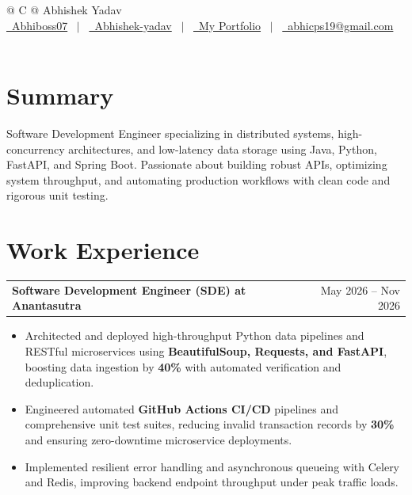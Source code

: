 \documentclass[a4paper,10pt]{article}
\makeatletter
\newenvironment{joblong}[2]
    {
    \begin{tabularx}{\linewidth}{@{}l X r@{}}
    \textbf{#1} & \hfill &  #2 \\[3.50pt]
    \end{tabularx}
    \begin{minipage}[t]{\linewidth}
    \begin{itemize}[nosep,after=\strut, leftmargin=1em, itemsep=3pt,label=--]
    }
    {
    \end{itemize}
    \end{minipage}
    }
\makeatother
\begin{document}
\pagestyle{empty}

\begin{tabularx}{\linewidth}{@{} C @{}}
\Huge{Abhishek Yadav}\\[7.5pt]
\href{https://github.com/Abhiboss07}{\raisebox{-0.05\height}\faGithub\ Abhiboss07} \ $|$ \
\href{https://linkedin.com/in/abhishek-yadav-4738032b7/}{\raisebox{-0.05\height}\faLinkedin\ Abhishek-yadav} \ $|$ \
\href{https://portfolio-abhishek-01.vercel.app}{\raisebox{-0.05\height}\faGlobe \ My Portfolio} \ $|$ \
\href{mailto:abhicps19@gmail.com}{\raisebox{-0.05\height}\faEnvelope \ abhicps19@gmail.com} \ \ \\
\end{tabularx}

\section{Summary}
Software Development Engineer specializing in distributed systems, high-concurrency architectures, and low-latency data storage using Java, Python, FastAPI, and Spring Boot. Passionate about building robust APIs, optimizing system throughput, and automating production workflows with clean code and rigorous unit testing.

\section{Work Experience}

\begin{joblong}{Software Development Engineer (SDE) at Anantasutra}{May 2026 -- Nov 2026}
\item Architected and deployed high-throughput Python data pipelines and RESTful microservices using \textbf{BeautifulSoup, Requests, and FastAPI}, boosting data ingestion by \textbf{40\%} with automated verification and deduplication.
\item Engineered automated \textbf{GitHub Actions CI/CD} pipelines and comprehensive unit test suites, reducing invalid transaction records by \textbf{30\%} and ensuring zero-downtime microservice deployments.
\item Implemented resilient error handling and asynchronous queueing with Celery and Redis, improving backend endpoint throughput under peak traffic loads.
\end{joblong}
\end{document}
